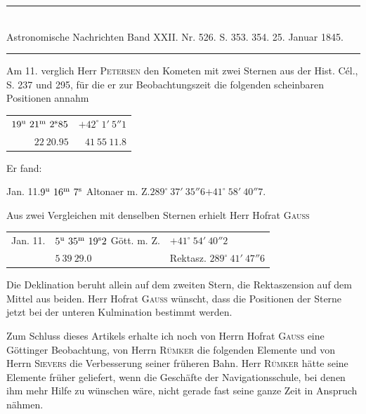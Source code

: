 \clearpage
\hypertarget{native-475-lower}{}
\begin{center}
\rule{0.55\linewidth}{0.4pt}\\[2pt]
Astronomische Nachrichten Band XXII. Nr. 526. S. 353. 354. 25. Januar 1845.\\[2pt]
\rule{0.55\linewidth}{0.4pt}
\end{center}

Am 11. verglich Herr \textsc{Petersen} den Kometen mit zwei Sternen aus der Hist. Cél., S. 237 und 295, für die er zur Beobachtungszeit die folgenden scheinbaren Positionen annahm

\begin{center}
\begin{tabular}{rr}
$19^{\rm u}\ 21^{\rm m}\ 2^{\rm s}85$ & $+42^\circ\ 1'\ 5''1$ \\
$22\ 20.95$ & $41\ 55\ 11.8$ \\
\end{tabular}
\end{center}
\noindent Er fand:

\begin{center}
Jan. 11.\quad $9^{\rm u}\ 16^{\rm m}\ 7^{\rm s}$ Altonaer m. Z.\quad $289^\circ\ 37'\ 35''6$\quad $+41^\circ\ 58'\ 40''7$.
\end{center}

Aus zwei Vergleichen mit denselben Sternen erhielt Herr Hofrat \textsc{Gauss}

\begin{center}
\begin{tabular}{lll}
Jan. 11. & $5^{\rm u}\ 35^{\rm m}\ 19^{\rm s}2$ Gött. m. Z. & $+41^\circ\ 54'\ 40''2$ \\
 & $5\ 39\ 29.0$ & Rektasz. $289^\circ\ 41'\ 47''6$ \\
\end{tabular}
\end{center}

Die Deklination beruht allein auf dem zweiten Stern, die Rektaszension auf dem Mittel aus beiden. Herr Hofrat \textsc{Gauss} wünscht, dass die Positionen der Sterne jetzt bei der unteren Kulmination bestimmt werden.

Zum Schluss dieses Artikels erhalte ich noch von Herrn Hofrat \textsc{Gauss} eine Göttinger Beobachtung, von Herrn \textsc{Rümker} die folgenden Elemente und von Herrn \textsc{Sievers} die Verbesserung seiner früheren Bahn. Herr \textsc{Rümker} hätte seine Elemente früher geliefert, wenn die Geschäfte der Navigationsschule, bei denen ihm mehr Hilfe zu wünschen wäre, nicht gerade fast seine ganze Zeit in Anspruch nähmen.

